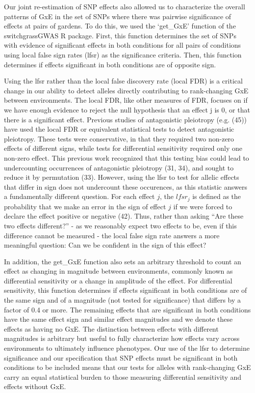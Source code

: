 \documentclass[
  9pt,
  twocolumn,
  twoside]{pnas-new}
\begin{document}
Our joint re-estimation of SNP effects also allowed us to characterize
the overall patterns of GxE in the set of SNPs where there was pairwise
significance of effects at pairs of gardens. To do this, we used the
`get\_GxE' function of the switchgrassGWAS R package. First, this
function determines the set of SNPs with evidence of significant effects
in both conditions for all pairs of conditions using local false sign
rates (lfsr) as the significance criteria. Then, this function
determines if effects significant in both conditions are of opposite
sign.

Using the lfsr rather than the local false discovery rate (local FDR) is
a critical change in our ability to detect alleles directly contributing
to rank-changing GxE between environments. The local FDR, like other
measures of FDR, focuses on if we have enough evidence to reject the
null hypothesis that an effect j is 0, or that there is a significant
effect. Previous studies of antagonistic pleiotropy (e.g. (45)) have
used the local FDR or equivalent statistical tests to detect
antagonistic pleiotropy. These tests were conservative, in that they
required two non-zero effects of different signs, while tests for
differential sensitivity required only one non-zero effect. This
previous work recognized that this testing bias could lead to
undercounting occurrences of antagonistic pleiotropy (31, 34), and
sought to reduce it by permutation (33). However, using the lfsr to test
for allelic effects that differ in sign does not undercount these
occurences, as this statistic answers a fundamentally different
question. For each effect \(j\), the \(lfsr_j\) is defined as the
probability that we make an error in the sign of effect \(j\) if we were
forced to declare the effect positive or negative (42). Thus, rather
than asking ``Are these two effects different?'' - as we reasonably
expect two effects to be, even if this difference cannot be measured -
the local false sign rate answers a more meaningful question: Can we be
confident in the sign of this effect?

In addition, the get\_GxE function also sets an arbitrary threshold to
count an effect as changing in magnitude between environments, commonly
known as differential sensitivity or a change in amplitude of the
effect. For differential sensitivity, this function determines if
effects significant in both conditions are of the same sign and of a
magnitude (not tested for significance) that differs by a factor of 0.4
or more. The remaining effects that are significant in both conditions
have the same effect sign and similar effect magnitudes and we denote
these effects as having no GxE. The distinction between effects with
different magnitudes is arbitrary but useful to fully characterize how
effects vary across environments to ultimately influence phenotypes. Our
use of the lfsr to determine significance and our specification that SNP
effects must be significant in both conditions to be included means that
our tests for alleles with rank-changing GxE carry an equal statistical
burden to those measuring differential sensitivity and effects without
GxE.
\end{document}
